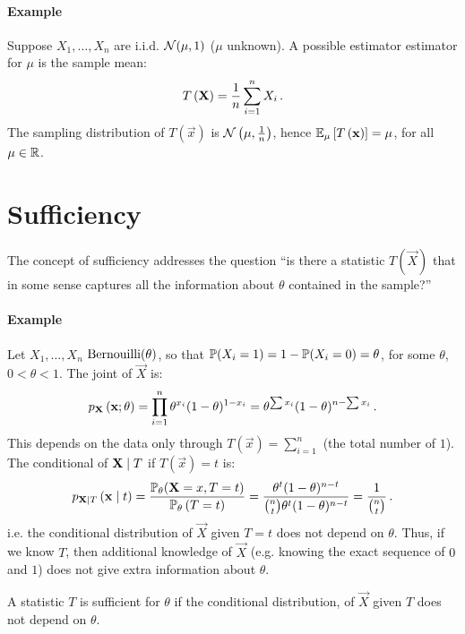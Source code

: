
\paragraph{Example}

Suppose $X_1, \dotsc, X_n$ are i.i.d. $\mathcal{N}(\mu, 1)$ ($\mu$ unknown). A possible estimator estimator for $\mu$ is the sample mean:
\[
 T\left(\mathbf{X}\right) = \frac{1}{n}\sum_{i=1}^n X_i \, {.}
\]
The sampling distribution of $T\left(\vec{x}\right)$ is $\mathcal{N}\left(\mu, \frac{1}{n}\right)$, hence $\mathbb{E}_\mu \left[ T\left(\mathbf{x}\right) \right] = \mu$, for all $\mu \in \mathbb{R}$.

\section{Sufficiency}
The concept of sufficiency addresses the question ``is there a statistic $T\left(\vec{X}\right)$ that in some sense captures all the information about $\theta$ contained in the sample?''

\paragraph{Example\label{example:1.2}}

Let $X_1, \dotsc, X_n$ \iid $\text{Bernouilli}(\theta)$, so that $\mathbb{P}(X_i = 1) = 1 - \mathbb{P}(X_i = 0) = \theta$, for some $\theta$, $0 < \theta < 1$. The joint \pmf of $\vec{X}$ is:
\[
p_{\mathbf{X}}\left(\mathbf{x}; \theta\right) = \prod_{i = 1}^n \theta^{x_i}(1-\theta)^{1-x_i} = \theta^{\sum x_i}(1 - \theta)^{n - \sum x_i} \, {.}
\]
This depends on the data only through $T\left(\vec{x}\right) = \sum_{i=1}^n$ (the total number of $1$). The conditional \pmf of $\mathbf{X} \mid T$ if $T\left(\vec{x}\right) = t$ is:
\[
p_{\mathbf{X} \mid T} \left( \mathbf{x} \mid t\right) = \frac{\mathbb{P}_\theta(\mathbf{X} = x, T = t)}{\mathbb{P}_\theta\left(T = t\right)} = \frac{\theta^t(1-\theta)^{n-t}}{\binom{n}{t}\theta^t(1-\theta)^{n-t}} = \frac{1}{\binom{n}{t}} \, {.}
\]
i.e. the conditional distribution of $\vec{X}$ given $T = t$ does not depend on $\theta$. Thus, if we know $T$, then additional knowledge of $\vec{X}$ (e.g. knowing the exact sequence of $0$ and $1$) does not give extra information about $\theta$. 

\begin{definition}
  A statistic $T$ is sufficient for $\theta$ if the conditional distribution, of $\vec{X}$ given $T$ does not depend on $\theta$.
\end{definition}

